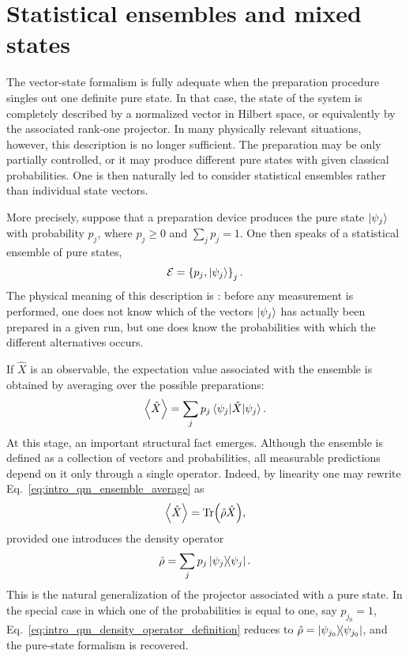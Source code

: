 \section{Statistical ensembles and mixed states}
\label{subsec:statistical_ensembles_and_mixed_states}

The vector-state formalism is fully adequate when the preparation procedure singles out one definite pure state. In that case, the state of the system is completely described by a normalized vector in Hilbert space, or equivalently by the associated rank-one projector. In many physically relevant situations, however, this description is no longer sufficient. The preparation may be only partially controlled, or it may produce different pure states with given classical probabilities. One is then naturally led to consider statistical ensembles rather than individual state vectors.

More precisely, suppose that a preparation device produces the pure state $\ket{\psi_j}$ with probability $p_j$, where $p_j\geq 0$ and $\sum_j p_j=1$. One then speaks of a statistical ensemble of pure states,
\begin{equation}
	\mathcal{E}=\left\{p_j,\ket{\psi_j}\right\}_j.
	\label{eq:intro_qm_statistical_ensemble}
\end{equation}
The physical meaning of this description is : before any measurement is performed, one does not know which of the vectors $\ket{\psi_j}$ has actually been prepared in a given run, but one does know the probabilities with which the different alternatives occurs.

If $\hat X$ is an observable, the expectation value associated with the ensemble is obtained by averaging over the possible preparations:
\begin{equation}
	\expval{\hat X}
	=
	\sum_j p_j \matrixel{\psi_j}{\hat X}{\psi_j}.
	\label{eq:intro_qm_ensemble_average}
\end{equation}
At this stage, an important structural fact emerges. Although the ensemble is defined as a collection of vectors and probabilities, all measurable predictions depend on it only through a single operator. Indeed, by linearity one may rewrite Eq.~\eqref{eq:intro_qm_ensemble_average} as
\begin{equation}
	\expval{\hat X}=\Tr(\hat \rho \hat X),
	\label{eq:intro_qm_expectation_value_density_operator}
\end{equation}
provided one introduces the density operator
\begin{equation}
	\hat \rho=\sum_j p_j \dyad{\psi_j}{\psi_j}.
	\label{eq:intro_qm_density_operator_definition}
\end{equation}
This is the natural generalization of the projector associated with a pure state. In the special case in which one of the probabilities is equal to one, say $p_{j_0}=1$, Eq.~\eqref{eq:intro_qm_density_operator_definition} reduces to $\hat \rho=\dyad{\psi_{j_0}}{\psi_{j_0}}$, and the pure-state formalism is recovered.

